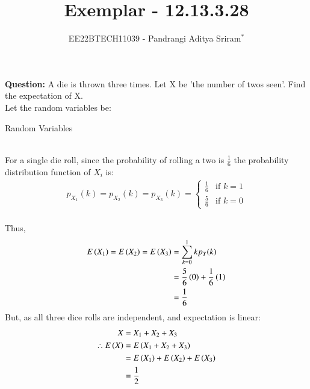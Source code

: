 \documentclass[journal,12pt,twocolumn]{IEEEtran}
\theoremstyle{remark}
\begin{document}

\vspace{3cm}

\title{Exemplar - 12.13.3.28}
\author{EE22BTECH11039 - Pandrangi Aditya Sriram$^{*}$%
}
\maketitle
\newpage
\bigskip

\renewcommand{\thefigure}{\theenumi}
\renewcommand{\thetable}{\theenumi}


\vspace{3cm}
\textbf{Question:} A die is thrown three times. Let X be 'the number of twos seen'. Find the expectation of X.\\
\solution
Let the random variables be:
\begin{table}[h!]
    
    \caption{Random Variables}
    \label{tab:12_13_3_28}
\end{table}\\
For a single die roll, since the probability of rolling a two is $\frac{1}{6}$ the probability distribution function of $X_i$ is:
\begin{align}
    p_{X_1}(k) = p_{X_2}(k) = p_{X_3}(k) =
    \begin{cases}
        \frac{1}{6} & \text{if } k = 1\\
        \frac{5}{6} & \text{if } k = 0
    \end{cases}
\end{align}\\
Thus, 
\begin{align}
    E\left(X_1\right) = E\left(X_2\right) = E\left(X_3\right) &= \sum_{k = 0}^{1} k p_Y(k) \\
    &= \frac{5}{6}\left(0\right) + \frac{1}{6}\left(1\right)\\
    &= \frac{1}{6}
\end{align}
But, as all three dice rolls are independent, and expectation is linear:
\begin{align}
    X &= X_1 + X_2 + X_3\\
    \therefore E\left(X\right) &= E\left(X_1 + X_2 + X_3\right)\\
    &= E\left(X_1\right) + E\left(X_2\right) + E\left(X_3\right) \\
    &= \frac{1}{2}
\end{align}
\end{document}
